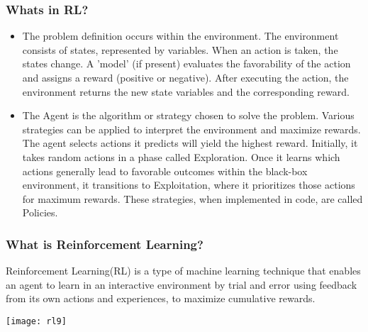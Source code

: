 \begin{frame}[fragile]\frametitle{Whats in RL?}

\begin{itemize}
\item   The problem definition occurs within the environment. The environment consists of states, represented by variables. When an action is taken, the states change. A 'model' (if present) evaluates the favorability of the action and assigns a reward (positive or negative). After executing the action, the environment returns the new state variables and the corresponding reward.
\item   The Agent is the algorithm or strategy chosen to solve the problem. Various strategies can be applied to interpret the environment and maximize rewards. The agent selects actions it predicts will yield the highest reward. Initially, it takes random actions in a phase called Exploration. Once it learns which actions generally lead to favorable outcomes within the black-box environment, it transitions to Exploitation, where it prioritizes those actions for maximum rewards. These strategies, when implemented in code, are called Policies.
\end{itemize}



\end{frame}


\begin{frame}[fragile]\frametitle{What is Reinforcement Learning?}
Reinforcement Learning(RL) is a type of machine learning technique that enables an agent to learn in an interactive environment by trial and error using feedback from its own actions and experiences, to maximize cumulative rewards.

\begin{center}
\texttt{[image: rl9]}
\end{center}


\end{frame}

